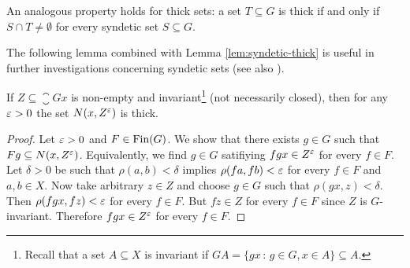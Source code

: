 \begin{rem}
An analogous property holds for thick sets: 
a set $T\subseteq G$ is thick if and only if $S\cap T\neq\emptyset$ for every syndetic set $S\subseteq G$.
\end{rem}
\noindent
The following lemma combined with Lemma \ref{lem:syndetic-thick} is useful in further investigations concerning syndetic sets (see also \cite{DI88}).

\begin{lem}\label{lem:minimalthick}
If $Z\subseteq \closure{Gx}$ is non-empty and invariant\footnote{Recall that a set $A\subseteq X$ is invariant if $GA=\{gx\,:\,g\in G,x\in A\}\subseteq A$.} (not necessarily closed), then for any $\varepsilon>0$ the set $N(x, Z^{\varepsilon})$ is thick.
\end{lem}


\begin{proof}
Let $\varepsilon>0$ and $F\in \operatorname{Fin}(G)$. We show that there exists $g\in G$ such that $Fg\subseteq N(x,Z^{\varepsilon})$. Equivalently, we find $g\in G$ satifiying $fgx\in Z^{\varepsilon}$ for every $f\in F$. Let $\delta>0$ be such that  $\rho(a,b)<\delta$ implies $\rho(fa, fb)<\varepsilon$ for every $f\in F$ and $a,b\in X$. Now take arbitrary $z\in Z$ and choose $g\in G$ such that  $\rho(gx, z)<\delta$. Then $\rho(fgx,fz)<\varepsilon$ for every $f\in F$.  But $fz\in Z$ for every $f\in F$ since $Z$ is $G$-invariant. Therefore $fg x\in Z^{\varepsilon}$ for every $f\in F$.
\end{proof}
\noindent

